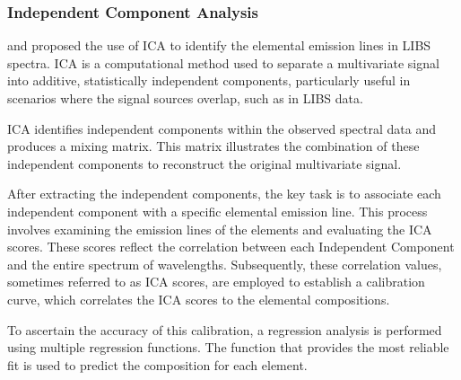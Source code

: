 \subsubsection{Independent Component Analysis}\label{sec:ica}
\citet{cleggRecalibrationMarsScience2017} and \citet{forniIndependentComponentAnalysis2013} proposed the use of ICA to identify the elemental emission lines in LIBS spectra. ICA is a computational method used to separate a multivariate signal into additive, statistically independent components, particularly useful in scenarios where the signal sources overlap, such as in LIBS data.

ICA identifies independent components within the observed spectral data and produces a mixing matrix.
This matrix illustrates the combination of these independent components to reconstruct the original multivariate signal.

After extracting the independent components, the key task is to associate each independent component with a specific elemental emission line.
This process involves examining the emission lines of the elements and evaluating the ICA scores.
These scores reflect the correlation between each Independent Component and the entire spectrum of wavelengths.
Subsequently, these correlation values, sometimes referred to as ICA scores, are employed to establish a calibration curve, which correlates the ICA scores to the elemental compositions.

To ascertain the accuracy of this calibration, a regression analysis is performed using multiple regression functions. The function that provides the most reliable fit is used to predict the composition for each element.

